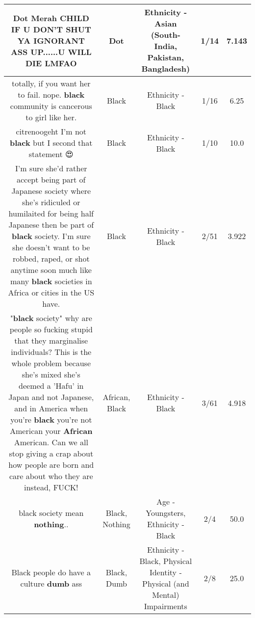 \documentclass[11pt]{article}
\newlength\mylength
\begin{document}
\begin{center}
\begin{longtable}{|C{.65\mylength}|C{.30\mylength}|C{.12\mylength}|C{.12\mylength}|C{.12\mylength}|}
  \small \@\textbf{Dot} Merah CHILD IF U DON'T SHUT YA IGNORANT ASS UP......U WILL DIE LMFAO\normalsize   & Dot & Ethnicity - Asian (South- India, Pakistan, Bangladesh) & 1/14 & 7.143 \\  \hline
  \small totally, if you want her to fail. nope. \textbf{black} community is cancerous to girl like her.\normalsize   & Black & Ethnicity - Black & 1/16 & 6.25 \\  \hline
  \small citrenoogeht I'm not \textbf{black} but I second that statement 😍\normalsize   & Black & Ethnicity - Black & 1/10 & 10.0 \\  \hline
  \small I'm sure she'd rather accept being part of Japanese society where she's ridiculed or humilaited for being half Japanese then be part of \textbf{black} society. I'm sure she doesn't want to be robbed, raped, or shot anytime soon much like many \textbf{black} societies in Africa or cities in the US have.\normalsize   & Black & Ethnicity - Black & 2/51 & 3.922 \\  \hline
  \small "\textbf{black} society" why are people so fucking stupid that they marginalise individuals? This is the whole problem because she's mixed she's deemed a 'Hafu' in Japan and not Japanese, and in America when you're \textbf{black} you're not American your \textbf{African} American. Can we all stop giving a crap about how people are born and care about who they are instead, FUCK!\normalsize   & African, Black & Ethnicity - Black & 3/61 & 4.918 \\  \hline
  \small black society mean \textbf{nothing}..\normalsize   & Black, Nothing & Age - Youngsters, Ethnicity - Black & 2/4 & 50.0 \\  \hline
  \small Black people do have a culture \textbf{dumb} ass\normalsize   & Black, Dumb & Ethnicity - Black, Physical Identity - Physical (and Mental) Impairments & 2/8 & 25.0 \\  \hline

\end{longtable}
\end{center}
\end{document}
